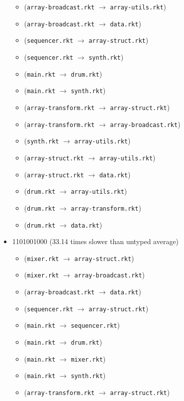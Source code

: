 \documentclass{article}
\newcommand{\mono}[1]{\texttt{#1}}
\begin{document}
\begin{itemize}
\begin{itemize}
  \item (\mono{array-broadcast.rkt} $\rightarrow$ \mono{array-utils.rkt})
  \item (\mono{array-broadcast.rkt} $\rightarrow$ \mono{data.rkt})
  \item (\mono{sequencer.rkt} $\rightarrow$ \mono{array-struct.rkt})
  \item (\mono{sequencer.rkt} $\rightarrow$ \mono{synth.rkt})
  \item (\mono{main.rkt} $\rightarrow$ \mono{drum.rkt})
  \item (\mono{main.rkt} $\rightarrow$ \mono{synth.rkt})
  \item (\mono{array-transform.rkt} $\rightarrow$ \mono{array-struct.rkt})
  \item (\mono{array-transform.rkt} $\rightarrow$ \mono{array-broadcast.rkt})
  \item (\mono{synth.rkt} $\rightarrow$ \mono{array-utils.rkt})
  \item (\mono{array-struct.rkt} $\rightarrow$ \mono{array-utils.rkt})
  \item (\mono{array-struct.rkt} $\rightarrow$ \mono{data.rkt})
  \item (\mono{drum.rkt} $\rightarrow$ \mono{array-utils.rkt})
  \item (\mono{drum.rkt} $\rightarrow$ \mono{array-transform.rkt})
  \item (\mono{drum.rkt} $\rightarrow$ \mono{data.rkt})
  \end{itemize}
\item 1101001000 (33.14 times slower than untyped average)
  \begin{itemize}
  \item (\mono{mixer.rkt} $\rightarrow$ \mono{array-struct.rkt})
  \item (\mono{mixer.rkt} $\rightarrow$ \mono{array-broadcast.rkt})
  \item (\mono{array-broadcast.rkt} $\rightarrow$ \mono{data.rkt})
  \item (\mono{sequencer.rkt} $\rightarrow$ \mono{array-struct.rkt})
  \item (\mono{main.rkt} $\rightarrow$ \mono{sequencer.rkt})
  \item (\mono{main.rkt} $\rightarrow$ \mono{drum.rkt})
  \item (\mono{main.rkt} $\rightarrow$ \mono{mixer.rkt})
  \item (\mono{main.rkt} $\rightarrow$ \mono{synth.rkt})
  \item (\mono{array-transform.rkt} $\rightarrow$ \mono{array-struct.rkt})

\end{itemize}
\end{itemize}
\end{document}
